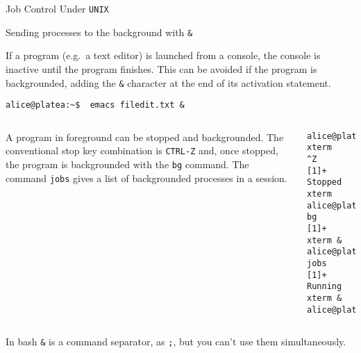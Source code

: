 \begin{frame}[t,fragile]{Job Control Under \texttt{UNIX}}


  \begin{block}{Sending processes to the background with  \alert{\texttt{\&}}}
    {\footnotesize
    If a program (e.g.\ a text editor) is launched from a console, the
console is inactive until the program finishes. This can be avoided if
the program is backgrounded, adding the \alert{\texttt{\&}} character at the end
of its activation statement.


      \begin{lstlisting}
alice@platea:~$  emacs filedit.txt &
      \end{lstlisting}
 
}
{\scriptsize

  \begin{columns}
      A program in foreground can be
      stopped and backgrounded. The conventional stop key combination
      is \alert{\texttt{CTRL-Z}}
      and, once stopped, the program is
      backgrounded with the \alert{\texttt{bg}} command.  The command
      \alert{\texttt{jobs}} gives a list of backgrounded processes in a session.
        \hspace{-3cm}
        \begin{lstlisting}
alice@platea:~$ xterm
^Z
[1]+  Stopped                 xterm
alice@platea:~$ bg
[1]+ xterm &
alice@platea:~$  jobs
[1]+  Running                 xterm &
alice@platea:~$
        \end{lstlisting}
    \end{columns}
  }
      {\footnotesize
In bash \alert{\texttt{\&}} is a command separator,  as  \alert{\texttt{;}}, but you can't use them simultaneously. 
}
  \end{block}
  
\end{frame}
